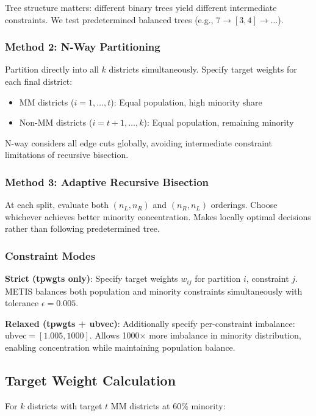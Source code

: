 Tree structure matters: different binary trees yield different intermediate constraints. We test predetermined balanced trees (e.g., $7 \to [3,4] \to \ldots$).

\subsubsection{Method 2: N-Way Partitioning}

Partition directly into all $k$ districts simultaneously. Specify target weights for each final district:
\begin{itemize}
\item MM districts ($i = 1, \ldots, t$): Equal population, high minority share
\item Non-MM districts ($i = t+1, \ldots, k$): Equal population, remaining minority
\end{itemize}

N-way considers all edge cuts globally, avoiding intermediate constraint limitations of recursive bisection.

\subsubsection{Method 3: Adaptive Recursive Bisection}

At each split, evaluate both $(n_L, n_R)$ and $(n_R, n_L)$ orderings. Choose whichever achieves better minority concentration. Makes locally optimal decisions rather than following predetermined tree.

\subsubsection{Constraint Modes}

\textbf{Strict (tpwgts only)}: Specify target weights $w_{ij}$ for partition $i$, constraint $j$. METIS balances both population and minority constraints simultaneously with tolerance $\epsilon = 0.005$.

\textbf{Relaxed (tpwgts + ubvec)}: Additionally specify per-constraint imbalance: $\text{ubvec} = [1.005, 1000]$. Allows 1000$\times$ more imbalance in minority distribution, enabling concentration while maintaining population balance.

\subsection{Target Weight Calculation}

For $k$ districts with target $t$ MM districts at 60\% minority:

